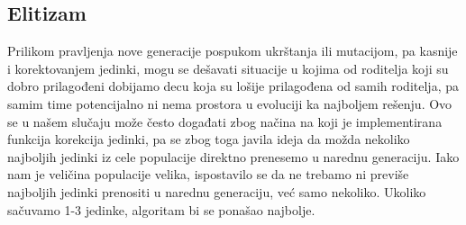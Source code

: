 \documentclass[a4paper]{article}
\begin{document}
\subsection{Elitizam}
Prilikom pravljenja nove generacije pospukom ukrštanja ili mutacijom, pa kasnije i korektovanjem jedinki, mogu se dešavati situacije u kojima od roditelja koji su dobro prilagođeni dobijamo decu koja su lošije prilagođena od samih roditelja, pa samim time potencijalno ni nema prostora u evoluciji ka najboljem rešenju. Ovo se u našem slučaju može često događati zbog načina na koji je implementirana funkcija korekcija jedinki, pa se zbog toga javila ideja da možda nekoliko najboljih jedinki iz cele populacije direktno prenesemo u narednu generaciju. Iako nam je veličina populacije velika, ispostavilo se da ne trebamo ni previše najboljih jedinki prenositi u narednu generaciju, već samo nekoliko. Ukoliko sačuvamo 1-3 jedinke, algoritam bi se ponašao najbolje.





\end{document}
